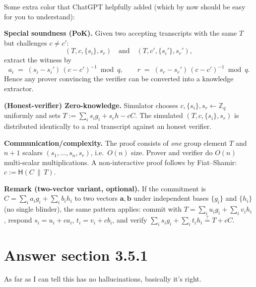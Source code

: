 \documentclass[11pt,a4paper]{article}
\begin{document}
\medskip

Some extra color that ChatGPT helpfully added (which by now should be easy for you to understand):

\medskip

\textbf{Special soundness (PoK).} Given two accepting transcripts with the same $T$
but challenges $c\neq c'$:
\[
(T,c,\{s_i\},s_r) \quad\text{and}\quad (T,c',\{s_i'\},s_r'),
\]
extract the witness by
\[
a_i \;=\; (s_i - s_i')\,(c - c')^{-1} \bmod q,\qquad
r \;=\; (s_r - s_r')\,(c - c')^{-1} \bmod q.
\]
Hence any prover convincing the verifier can be converted into a knowledge extractor.

\textbf{(Honest-verifier) Zero-knowledge.} Simulator chooses $c,\{s_i\},s_r \leftarrow \mathbb{Z}_q$
uniformly and sets $T := \sum_i s_i g_i + s_r h - c C$. The simulated $(T,c,\{s_i\},s_r)$
is distributed identically to a real transcript against an honest verifier.

\textbf{Communication/complexity.} The proof consists of \emph{one} group element $T$
and \emph{$n{+}1$} scalars $(s_1,\ldots,s_n,s_r)$, i.e.\ $O(n)$ size. Prover and verifier
do $O(n)$ multi-scalar multiplications. A non-interactive proof follows by Fiat--Shamir:
$c := \mathsf{H}(C \,\|\, T)$.

\medskip
\textbf{Remark (two-vector variant, optional).}
If the commitment is $C=\sum_i a_i g_i + \sum_i b_i h_i$ to two vectors
$\mathbf{a},\mathbf{b}$ under independent bases $\{g_i\}$ and $\{h_i\}$ (no single blinder),
the same pattern applies: commit with $T=\sum_i u_i g_i + \sum_i v_i h_i$,
respond $s_i=u_i+c a_i$, $t_i=v_i+c b_i$, and verify
$\sum_i s_i g_i + \sum_i t_i h_i \stackrel{?}{=} T + c C$.



\section{Answer section 3.5.1}

As far as I can tell this has no hallucinations, basically it's right.

\medskip
\end{document}
